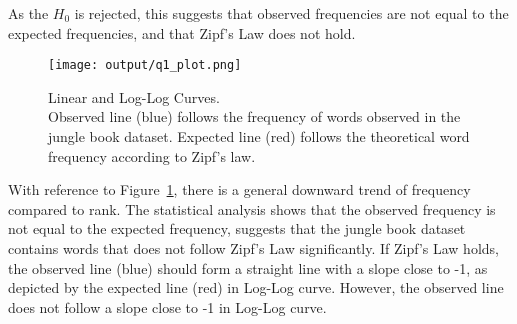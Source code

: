 As the $H_0$ is rejected, this suggests that observed frequencies are not equal to the expected frequencies, and that Zipf's Law does not hold.


\begin{figure}[h!]
    \centering
    \texttt{[image: output/q1\_plot.png]}
    \caption{
        Linear and Log-Log Curves.\\
        Observed line (blue) follows the frequency of words observed in the jungle book dataset.
        Expected line (red) follows the theoretical word frequency according to Zipf's law.
    }
    \label{fig:linear_log_curve}
\end{figure}

With reference to Figure~\ref{fig:linear_log_curve}, there is a general downward trend of frequency compared to rank.
The statistical analysis shows that the observed frequency is not equal to the expected frequency, suggests that the jungle book dataset contains words that does not follow Zipf's Law significantly.
If Zipf's Law holds, the observed line (blue) should form a straight line with a slope close to -1, as depicted by the expected line (red) in Log-Log curve. 
However, the observed line does not follow a slope close to -1 in Log-Log curve. 
